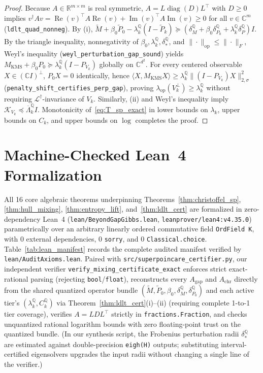 \documentclass[11pt,a4paper]{article}
\theoremstyle{definition}
\newcommand{\R}{\mathbb{R}}
\newcommand{\Q}{\mathbb{Q}}
\newcommand{\C}{\mathbb{C}}
\newcommand{\KMS}{\mathrm{KMS}}
\newcommand{\Kchr}{\mathcal{K}}
\begin{document}
\begin{proof}
Because $A \in \R^{m \times m}$ is real symmetric, $A = L \operatorname{diag}(D) L^\top$ with $D \ge 0$ implies $v^\dagger A v = \operatorname{Re}(v)^\top A \operatorname{Re}(v) + \operatorname{Im}(v)^\top A \operatorname{Im}(v) \ge 0$ for all $v \in \C^m$ (\texttt{ldlt\_quad\_nonneg}). By (i), $\tilde{M} + \beta_0 \tilde{P}_0 - \lambda_k^{\Q}(I - \tilde{P}_k) \succeq (\delta_M^{\Q} + \beta_0 \delta_{P_0}^{\Q} + \lambda_k^{\Q} \delta_P^{\Q}) I$. By the triangle inequality, nonnegativity of $\beta_0, \lambda_k^{\Q}, \delta_*^{\Q}$, and $\|\cdot\|_{\mathrm{op}} \le \|\cdot\|_F$, Weyl's inequality (\texttt{weyl\_perturbation\_gap\_sound}) yields $M_{\KMS} + \beta_0 P_0 \succeq \lambda_k^{\Q}(I - P_{V_k})$ globally on $\C^{d^2}$. For every centered observable $X \in (\C I)^\perp$, $P_0 X = 0$ identically, hence $\langle X, M_{\KMS} X \rangle \ge \lambda_k^{\Q}\|(I - P_{V_k}) X\|_{2,\sigma}^2$ (\texttt{penalty\_shift\_certifies\_perp\_gap}), proving $\lambda_{\mathrm{op}}(V_k^\perp) \ge \lambda_k^{\Q}$ without requiring $\mathcal{L}^\dagger$-invariance of $V_k$. Similarly, (ii) and Weyl's inequality imply $\Kchr_{V_k} \preceq \overline{\Lambda}_k^{\Q} I$. Monotonicity of~\eqref{eq:T_sp_exact} in lower bounds on $\lambda_k$, upper bounds on $C_k$, and upper bounds on $\log$ completes the proof.
\end{proof}

\section{Machine-Checked Lean~4 Formalization}
\label{sec:formalization}

All 16 core algebraic theorems underpinning Theorems~\ref{thm:christoffel_sp}, \ref{thm:hull_mixing}, \ref{thm:entropy_lift}, and~\ref{thm:ldlt_cert} are formalized in zero-dependency Lean~4 (\texttt{lean/BeyondGapGibbs.lean}, \texttt{leanprover/lean4:v4.35.0}) parametrically over an arbitrary linearly ordered commutative field \texttt{OrdField K}, with 0 external dependencies, 0 \texttt{sorry}, and 0 \texttt{Classical.choice}. Table~\ref{tab:lean_manifest} records the complete audited manifest verified by \texttt{lean/AuditAxioms.lean}. Paired with \texttt{src/superpoincare\_certifier.py}, our independent verifier \texttt{verify\_mixing\_certificate\_exact} enforces strict exact-rational parsing (rejecting \texttt{bool}/\texttt{float}), reconstructs every $A_{\mathrm{gap}}$ and $A_{\mathrm{chr}}$ directly from the shared quantized operator bundle $(\tilde{M}, \tilde{P}_0, \beta_0, \delta_M^{\Q}, \delta_{P_0}^{\Q})$ and each active tier's $(\lambda_k^{\Q}, C_k^{\Q})$ via Theorem~\ref{thm:ldlt_cert}(i)--(ii) (requiring complete 1-to-1 tier coverage), verifies $A = L D L^\top$ strictly in \texttt{fractions.Fraction}, and checks unquantized rational logarithm bounds with zero floating-point trust on the quantized bundle. (In our synthesis script, the Frobenius perturbation radii $\delta_*^{\Q}$ are estimated against double-precision \texttt{eigh(H)} outputs; substituting interval-certified eigensolvers upgrades the input radii without changing a single line of the verifier.)
\end{document}
